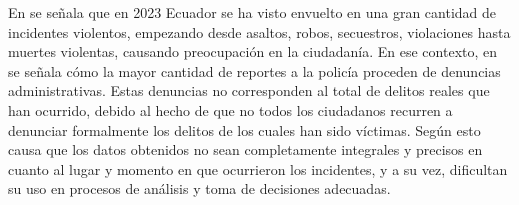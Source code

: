 En \cite{benitezalvarezImplementingComprehensiveCitizen2019} se señala que en 2023 Ecuador se
ha visto envuelto en una gran cantidad de incidentes violentos, empezando
desde asaltos, robos, secuestros, violaciones hasta muertes violentas, causando preocupación
en la ciudadanía. En ese contexto, en \cite{alvarezCompendioEconomicoSocial2022} se señala
cómo la mayor cantidad de reportes a la policía proceden de denuncias administrativas.
Estas denuncias no corresponden al total de delitos reales que han ocurrido, debido al hecho de
que no todos los ciudadanos recurren a denunciar formalmente los delitos de los cuales han sido víctimas.
Según \cite{castroaniyarPaintingsCrimeComposed2019} esto causa que los datos obtenidos no sean
completamente integrales y precisos en cuanto al lugar y momento en que ocurrieron los incidentes, y
a su vez, dificultan su uso en procesos de análisis y toma de decisiones adecuadas.

\bigbreak




